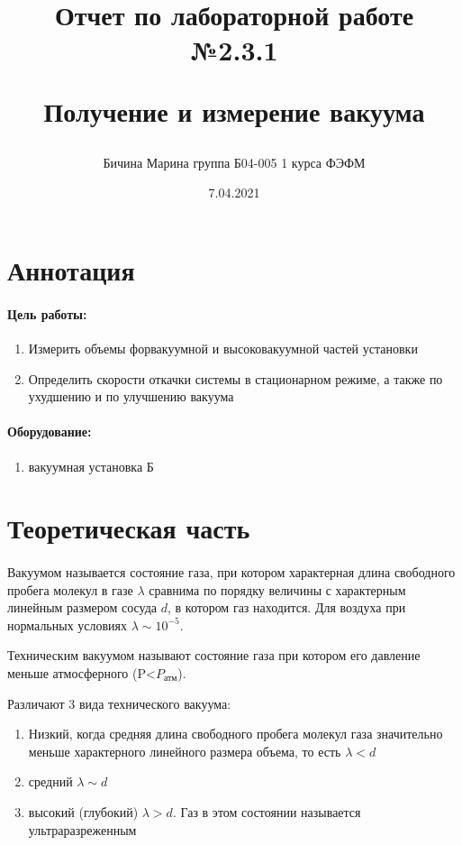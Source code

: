 \documentclass[a4paper,12pt]{article}
\author{Бичина Марина 
группа Б04-005 1 курса ФЭФМ}
\title{Отчет по лабораторной работе №2.3.1


Получение и измерение вакуума}
\date{7.04.2021}
\begin{document}

\maketitle
\newpage

\section{Аннотация}

\paragraph{Цель работы:} 
\begin{enumerate}
\itemsep0em
\item Измерить объемы форвакуумной и высоковакуумной частей установки
\item Определить скорости откачки системы в стационарном режиме, а также по ухудшению и по улучшению вакуума
\end{enumerate}
\paragraph{Оборудование:}
\begin{enumerate}
\itemsep0em
\item вакуумная установка Б
\end{enumerate}
\section{Теоретическая часть}
\paragraph{}
Вакуумом называется состояние газа, при котором характерная длина свободного пробега молекул в газе $\lambda$ сравнима по порядку величины с характерным линейным размером сосуда $d$, в котором газ находится. Для воздуха при нормальных условиях $\lambda \sim 10^{-5}$.

Техническим вакуумом называют состояние газа при котором его давление меньше атмосферного (P<$P_{\text{атм}}$).

Различают 3 вида технического вакуума:
\begin{enumerate}
\itemsep0em
\item Низкий, когда средняя длина свободного пробега молекул газа значительно меньше характерного линейного размера объема, то есть $\lambda < d$
\item средний $\lambda \sim d$
\item высокий (глубокий) $\lambda > d$. Газ в этом состоянии называется ультраразреженным 
\end{enumerate}
\end{document}

